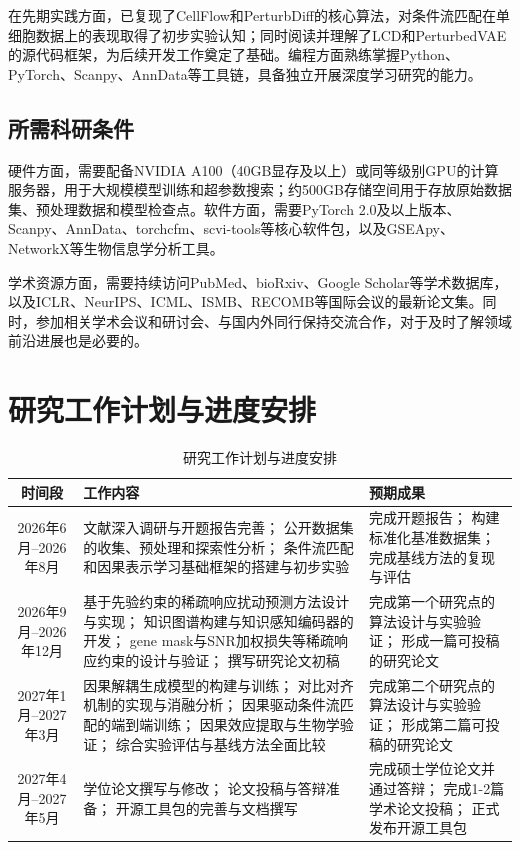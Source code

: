 在先期实践方面，已复现了CellFlow和PerturbDiff的核心算法，对条件流匹配在单细胞数据上的表现取得了初步实验认知；同时阅读并理解了LCD和PerturbedVAE的源代码框架，为后续开发工作奠定了基础。编程方面熟练掌握Python、PyTorch、Scanpy、AnnData等工具链，具备独立开展深度学习研究的能力。

\subsection{所需科研条件}

硬件方面，需要配备NVIDIA A100（40GB显存及以上）或同等级别GPU的计算服务器，用于大规模模型训练和超参数搜索；约500GB存储空间用于存放原始数据集、预处理数据和模型检查点。软件方面，需要PyTorch 2.0及以上版本、Scanpy、AnnData、torchcfm、scvi-tools等核心软件包，以及GSEApy、NetworkX等生物信息学分析工具。

学术资源方面，需要持续访问PubMed、bioRxiv、Google Scholar等学术数据库，以及ICLR、NeurIPS、ICML、ISMB、RECOMB等国际会议的最新论文集。同时，参加相关学术会议和研讨会、与国内外同行保持交流合作，对于及时了解领域前沿进展也是必要的。

\clearpage
\section{研究工作计划与进度安排}

\begin{table}[ht]
\centering
\small
\caption{研究工作计划与进度安排}
\begin{tabular}{|c|p{5.5cm}|p{4.5cm}|}
\hline
\textbf{时间段} & \textbf{工作内容} & \textbf{预期成果} \\
\hline
2026年6月--2026年8月 &
文献深入调研与开题报告完善；
公开数据集的收集、预处理和探索性分析；
条件流匹配和因果表示学习基础框架的搭建与初步实验 &
完成开题报告；
构建标准化基准数据集；
完成基线方法的复现与评估 \\
\hline
2026年9月--2026年12月 &
基于先验约束的稀疏响应扰动预测方法设计与实现；
知识图谱构建与知识感知编码器的开发；
gene mask与SNR加权损失等稀疏响应约束的设计与验证；
撰写研究论文初稿 &
完成第一个研究点的算法设计与实验验证；
形成一篇可投稿的研究论文 \\
\hline
2027年1月--2027年3月 &
因果解耦生成模型的构建与训练；
对比对齐机制的实现与消融分析；
因果驱动条件流匹配的端到端训练；
因果效应提取与生物学验证；
综合实验评估与基线方法全面比较 &
完成第二个研究点的算法设计与实验验证；
形成第二篇可投稿的研究论文 \\
\hline
2027年4月--2027年5月 &
学位论文撰写与修改；
论文投稿与答辩准备；
开源工具包的完善与文档撰写 &
完成硕士学位论文并通过答辩；
完成1-2篇学术论文投稿；
正式发布开源工具包 \\
\hline
\end{tabular}
\end{table}

\nocite{*}%

